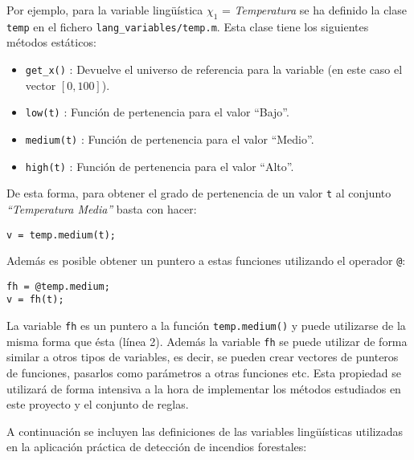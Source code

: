 Por ejemplo, para la variable lingüística $\chi_1$ = \emph{Temperatura} se ha definido la clase \lstinline|temp| en el fichero \lstinline|lang_variables/temp.m|. Esta clase tiene los siguientes métodos estáticos:
\begin{itemize}
\item \lstinline|get_x()| : Devuelve el universo de referencia para la variable (en este caso el vector $[0,100]$).
\item \lstinline|low(t)| : Función de pertenencia para el valor ``Bajo''.
\item \lstinline|medium(t)| : Función de pertenencia para el valor ``Medio''.
\item \lstinline|high(t)| : Función de pertenencia para el valor ``Alto''.
\end{itemize}

De esta forma, para obtener el grado de pertenencia de un valor \lstinline|t| al conjunto \emph{``Temperatura Media''} basta con hacer:

\begin{lstlisting}
v = temp.medium(t);
\end{lstlisting}

Además es posible obtener un puntero a estas funciones utilizando el operador \lstinline|@|:

\begin{lstlisting}
fh = @temp.medium;
v = fh(t);
\end{lstlisting}

La variable \lstinline|fh| es un puntero a la función \lstinline|temp.medium()| y puede utilizarse de la misma forma que ésta (línea 2). Además la variable \lstinline|fh| se puede utilizar de forma similar a otros tipos de variables, es decir, se pueden crear vectores de punteros de funciones, pasarlos como parámetros a otras funciones etc. Esta propiedad se utilizará de forma intensiva a la hora de implementar los métodos estudiados en este proyecto y el conjunto de reglas.

A continuación se incluyen las definiciones de las variables lingüísticas utilizadas en la aplicación práctica de detección de incendios forestales:






